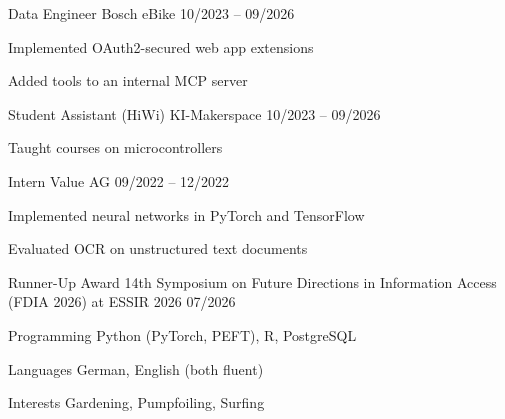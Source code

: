 \documentclass[11pt, a4paper]{awesome-cv}
\begin{document}
\begin{cventries}
  \cventry
    {Data Engineer}
    {Bosch eBike}
    {}
    {10/2023 -- 09/2026}
    {
      \begin{cvitems}
        \item {Implemented OAuth2-secured web app extensions}
        \item {Added tools to an internal MCP server}
      \end{cvitems}
    }

  \cventry
    {Student Assistant (HiWi)}
    {KI-Makerspace}
    {}
    {10/2023 -- 09/2026}
    {
      \begin{cvitems}
        \item {Taught courses on microcontrollers}
      \end{cvitems}
    }

  \cventry
    {Intern}
    {Value AG}
    {}
    {09/2022 -- 12/2022}
    {
      \begin{cvitems}
        \item {Implemented neural networks in PyTorch and TensorFlow}
        \item {Evaluated OCR on unstructured text documents}
      \end{cvitems}
    }
\end{cventries}


\begin{cvhonors}
  \cvhonor
    {Runner-Up Award}
    {14th Symposium on Future Directions in Information Access (FDIA 2026) at ESSIR 2026}
    {}
    {07/2026}
\end{cvhonors}


\begin{cvskills}
  \cvskill
    {Programming}
    {Python (PyTorch, PEFT), R, PostgreSQL}

  \cvskill
    {Languages}
    {German, English (both fluent)}

  \cvskill
    {Interests}
    {Gardening, Pumpfoiling, Surfing}
\end{cvskills}
\end{document}
